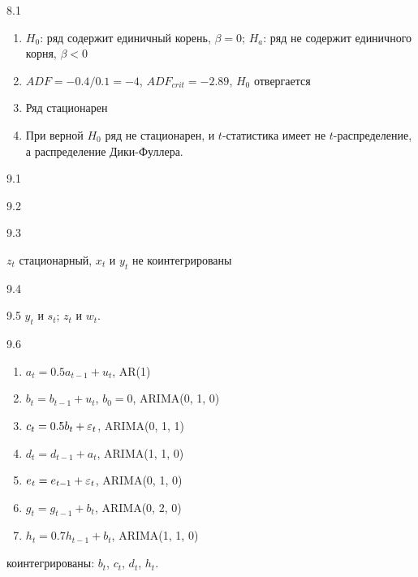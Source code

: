 \protect \hypertarget {soln:8.1}{}
\begin{solution}{{8.1}}

\begin{enumerate}
\item $H_0$: ряд содержит единичный корень, $\beta=0$; $H_a$: ряд не содержит единичного корня, $\beta<0$
\item $ADF=-0.4/0.1=-4$, $ADF_{crit}=-2.89$, $H_0$ отвергается
\item Ряд стационарен
\item При верной $H_0$ ряд не стационарен, и  $t$-статистика имеет не $t$-распределение, а распределение Дики-Фуллера.
\end{enumerate}
\end{solution}
\protect \hypertarget {soln:9.1}{}
\begin{solution}{{9.1}}

\end{solution}
\protect \hypertarget {soln:9.2}{}
\begin{solution}{{9.2}}

\end{solution}
\protect \hypertarget {soln:9.3}{}
\begin{solution}{{9.3}}

$z_t$ стационарный, $x_t$ и $y_t$ не коинтегрированы
\end{solution}
\protect \hypertarget {soln:9.4}{}
\begin{solution}{{9.4}}

\end{solution}
\protect \hypertarget {soln:9.5}{}
\begin{solution}{{9.5}}
$y_t$ и $s_t$; $z_t$ и $w_t$.
\end{solution}
\protect \hypertarget {soln:9.6}{}
\begin{solution}{{9.6}}
  \begin{enumerate}
    \item $a_t = 0.5 a_{t-1} + u_t$, AR(1)
    \item $b_t = b_{t-1} + u_t$, $b_0 = 0$, ARIMA(0, 1, 0)
    \item $c_t = 0.5 b_t + \varepsilon_t$, ARIMA(0, 1, 1)
    \item $d_t = d_{t-1} + a_t$, ARIMA(1, 1, 0)
    \item $e_t = e_{t-1} + \varepsilon_t$, ARIMA(0, 1, 0)
    \item $g_t = g_{t-1} + b_t$, ARIMA(0, 2, 0)
    \item $h_t = 0.7 h_{t-1} + b_t$, ARIMA(1, 1, 0)
  \end{enumerate}
  коинтегрированы: $b_t$, $c_t$, $d_t$, $h_t$.
\end{solution}
